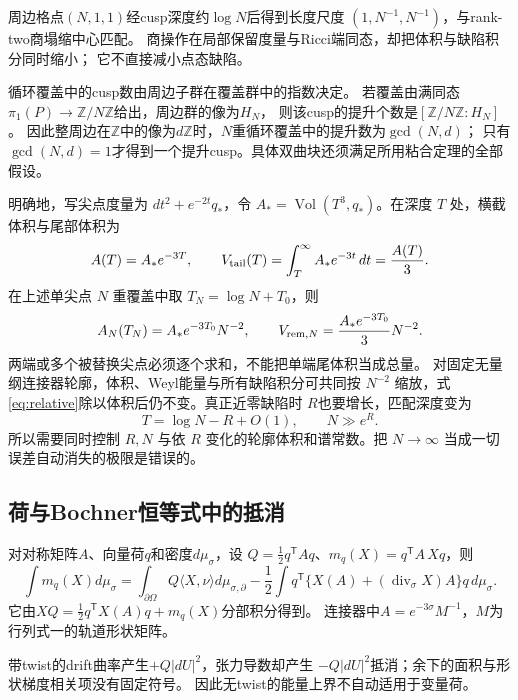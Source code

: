 \documentclass[UTF8,a4paper,11pt,fontset=fandol]{ctexart}
\numberwithin{equation}{section}
\theoremstyle{definition}
\newcommand{\Vol}{\operatorname{Vol}}
\newcommand{\Z}{\mathbb Z}
\begin{document}
周边格点$(N,1,1)$经cusp深度约$\log N$后得到长度尺度
$(1,N^{-1},N^{-1})$，与rank-two商塌缩中心匹配。
商操作在局部保留度量与Ricci端同态，却把体积与缺陷积分同时缩小；
它不直接减小点态缺陷。

循环覆盖中的cusp数由周边子群在覆盖群中的指数决定。
若覆盖由满同态$\pi_1(P)\to\Z/N\Z$给出，周边群的像为$H_N$，
则该cusp的提升个数是$[\Z/N\Z:H_N]$。
因此整周边在$\Z$中的像为$d\Z$时，$N$重循环覆盖中的提升数为$\gcd(N,d)$；
只有$\gcd(N,d)=1$才得到一个提升cusp。具体双曲块还须满足所用粘合定理的全部假设。

明确地，写尖点度量为 $dt^2+e^{-2t}q_*$，令
$A_*=\Vol(T^3,q_*)$。在深度 $T$ 处，横截体积与尾部体积为
\begin{equation}\label{eq:cusp-tail}
 A(T)=A_*e^{-3T},\qquad
 V_{\rm tail}(T)=\int_T^\infty A_*e^{-3t}\,dt=\frac{A(T)}3.
\end{equation}
在上述单尖点 $N$ 重覆盖中取 $T_N=\log N+T_0$，则
\begin{equation}\label{eq:cusp-cover-scale}
 A_N(T_N)=A_*e^{-3T_0}N^{-2},\qquad
 V_{{\rm rem},N}=\frac{A_*e^{-3T_0}}3N^{-2}.
\end{equation}
两端或多个被替换尖点必须逐个求和，不能把单端尾体积当成总量。
对固定无量纲连接器轮廓，体积、Weyl能量与所有缺陷积分可共同按 $N^{-2}$ 缩放，式\eqref{eq:relative}除以体积后仍不变。真正近零缺陷时 $R$也要增长，匹配深度变为
\begin{equation}\label{eq:RN}
T=\log N-R+O(1),\qquad N\gg e^R.
\end{equation}
所以需要同时控制 $R,N$ 与依 $R$ 变化的轮廓体积和谱常数。把 $N\to\infty$ 当成一切误差自动消失的极限是错误的。

\subsection{荷与Bochner恒等式中的抵消}
对对称矩阵$A$、向量荷$q$和密度$d\mu_\sigma$，设
$Q=\frac12q^{\mathsf T}Aq$、$m_q(X)=q^{\mathsf T}A\,Xq$，则
\begin{equation}\label{eq:charge}
\int m_q(X)d\mu_\sigma=
\int_{\partial\Omega}Q\langle X,\nu\rangle d\mu_{\sigma,\partial}
-\frac12\int q^{\mathsf T}\{X(A)+(\operatorname{div}_\sigma X)A\}q\,d\mu_\sigma.
\end{equation}
它由$XQ=\frac12q^{\mathsf T}X(A)q+m_q(X)$分部积分得到。
连接器中$A=e^{-3\sigma}M^{-1}$，$M$为行列式一的轨道形状矩阵。

带twist的drift曲率产生$+Q|dU|^2$，张力导数却产生
$-Q|dU|^2$抵消；余下的面积与形状梯度相关项没有固定符号。
因此无twist的能量上界不自动适用于变量荷。
\end{document}
